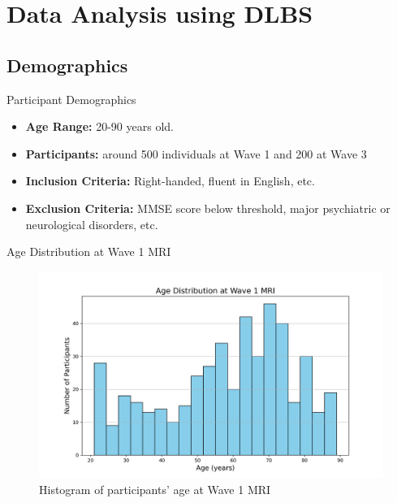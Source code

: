 \documentclass{beamer}
\begin{document}
\section{Data Analysis using DLBS}
\subsection{Demographics}
\begin{frame}{Participant Demographics}
  \begin{itemize}
    \item \textbf{Age Range:} 20-90 years old.
    \item \textbf{Participants:} around 500 individuals at Wave 1 and 200 at Wave 3
    \item \textbf{Inclusion Criteria:} Right-handed, fluent in English, etc.
    \item \textbf{Exclusion Criteria:} MMSE score below threshold, major psychiatric or neurological disorders, etc.
  \end{itemize}
\end{frame}

\begin{frame}{Age Distribution at Wave 1 MRI}
  \begin{figure}
    \centering
    \includegraphics[width=0.8\linewidth]{age_distribution.png}
    \caption{Histogram of participants' age at Wave 1 MRI}
  \end{figure}
\end{frame}
\end{document}
